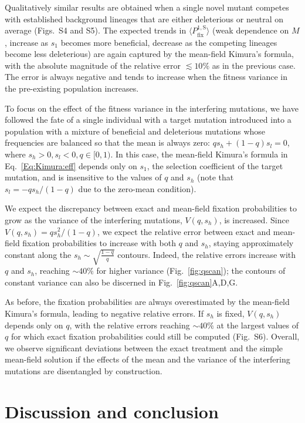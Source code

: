 \documentclass[9pt,twocolumn,twoside]{gsajnl}
\newcommand{\fix}{\mathrm{fix}}
\begin{document}
Qualitatively similar results are obtained when a single novel mutant competes with established background lineages that are either deleterious or neutral on average (Figs.~S4 and S5).
The expected trends in $\langle P_\fix^{1,\mathrm{S}} \rangle$ (weak dependence on $M$, increase as $s_1$ becomes more beneficial, decrease as the competing lineages become less deleterious)
are again captured by the mean-field Kimura's formula, with the absolute magnitude of the relative error $\lesssim 10\%$ as in the previous case. The error is always negative and tends to increase
when the fitness variance in the pre-existing population increases.

To focus on the effect of the fitness variance in the interfering mutations, we have followed the fate of a single individual with a target mutation introduced into a population with a mixture of
beneficial and deleterious mutations whose frequencies are balanced so that the mean is always zero: $q s_h + (1-q) s_l = 0$, where $s_h > 0, s_l < 0, q \in [0,1)$. In this case, the mean-field Kimura's formula in 
Eq.~\eqref{Eq:Kimura:eff} depends only on $s_1$, the selection coefficient of the target mutation, and is insensitive to the values of $q$ and $s_h$ (note that $s_l = - q s_h/(1 - q)$
due to the zero-mean condition).

We expect the discrepancy between exact and mean-field fixation probabilities to grow as the variance of the interfering mutations, $V(q,s_h)$, is increased.
Since $V(q,s_h) = q s_h^2/(1-q)$, we expect the relative error between exact and mean-field fixation probabilities to increase with both $q$ and $s_h$, staying approximately constant 
along the $s_h \sim \sqrt{\frac{1-q}{q}}$ contours. Indeed, the relative errors increase with $q$ and $s_h$, reaching $\sim 40\%$ for higher variance (Fig.~\ref{fig:qscan});
the contours of constant variance can also be discerned in Fig.~\ref{fig:qscan}A,D,G.

As before, the fixation probabilities are always overestimated by the mean-field Kimura's formula, leading to negative relative errors. If $s_h$ is fixed, $V(q,s_h)$ depends only on $q$, with the relative
errors reaching $\sim 40\%$ at the largest values of $q$ for which exact fixation probabilities could still be computed (Fig.~S6). Overall, we observe significant deviations between the exact
treatment and the simple mean-field solution if the effects of the mean and the variance of the interfering mutations are disentangled by construction.


\section{Discussion and conclusion}
\end{document}
